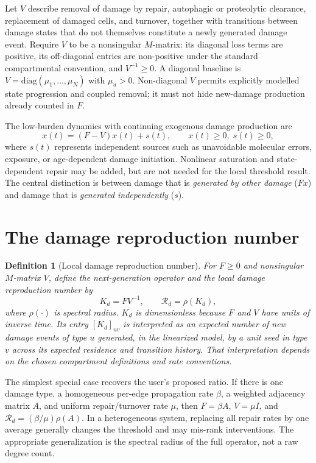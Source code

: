\documentclass[11pt,a4paper]{article}
\newtheorem{definition}{Definition}
\newcommand{\Rd}{\mathcal{R}_{d}}
\newcommand{\rhoop}{\rho}
\begin{document}
Let $V$ describe removal of damage by repair, autophagic or proteolytic clearance, replacement of damaged cells, and turnover, together with transitions between damage states that do not themselves constitute a newly generated damage event. Require $V$ to be a nonsingular $M$-matrix: its diagonal loss terms are positive, its off-diagonal entries are non-positive under the standard compartmental convention, and $V^{-1}\geq0$. A diagonal baseline is $V=\mathrm{diag}(\mu_1,\ldots,\mu_N)$ with $\mu_u>0$. Non-diagonal $V$ permits explicitly modelled state progression and coupled removal; it must not hide new-damage production already counted in $F$.

The low-burden dynamics with continuing exogenous damage production are
\begin{equation}
\dot{x}(t) = (F-V)x(t) + s(t), \qquad x(t)\geq0,\; s(t)\geq0,
\label{eq:system}
\end{equation}
where $s(t)$ represents independent sources such as unavoidable molecular errors, exposure, or age-dependent damage initiation. Nonlinear saturation and state-dependent repair may be added, but are not needed for the local threshold result. The central distinction is between damage that is \emph{generated by other damage} ($F x$) and damage that is \emph{generated independently} ($s$).

\section{The damage reproduction number}
\begin{definition}[Local damage reproduction number]
For $F\geq0$ and nonsingular $M$-matrix $V$, define the next-generation operator and the local damage reproduction number by
\begin{equation}
K_d = FV^{-1}, \qquad \Rd = \rhoop(K_d),
\label{eq:Rd}
\end{equation}
where $\rhoop(\cdot)$ is spectral radius. $K_d$ is dimensionless because $F$ and $V$ have units of inverse time. Its entry $[K_d]_{uv}$ is interpreted as an expected number of new damage events of type $u$ generated, in the linearized model, by a unit seed in type $v$ across its expected residence and transition history. That interpretation depends on the chosen compartment definitions and rate conventions.
\end{definition}

The simplest special case recovers the user's proposed ratio. If there is one damage type, a homogeneous per-edge propagation rate $\beta$, a weighted adjacency matrix $A$, and uniform repair/turnover rate $\mu$, then $F=\beta A$, $V=\mu I$, and $\Rd=(\beta/\mu)\rhoop(A)$. In a heterogeneous system, replacing all repair rates by one average generally changes the threshold and may mis-rank interventions. The appropriate generalization is the spectral radius of the full operator, not a raw degree count.
\end{document}

